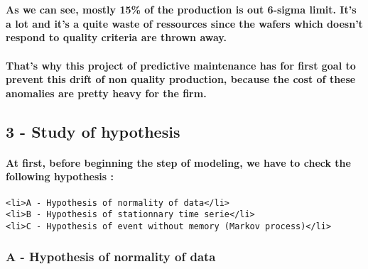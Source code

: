 \documentclass[11pt]{article}
\begin{document}
    \begin{center}
    \end{center}
    { \hspace*{\fill} \\}
    
    \paragraph{As we can see, mostly 15\% of the production is out 6-sigma
limit. It's a lot and it's a quite waste of ressources since the wafers
which doesn't respond to quality criteria are thrown
away.}\label{as-we-can-see-mostly-15-of-the-production-is-out-6-sigma-limit.-its-a-lot-and-its-a-quite-waste-of-ressources-since-the-wafers-which-doesnt-respond-to-quality-criteria-are-thrown-away.}

\paragraph{That's why this project of predictive maintenance has for
first goal to prevent this drift of non quality production, because the
cost of these anomalies are pretty heavy for the
firm.}\label{thats-why-this-project-of-predictive-maintenance-has-for-first-goal-to-prevent-this-drift-of-non-quality-production-because-the-cost-of-these-anomalies-are-pretty-heavy-for-the-firm.}

    \subsection{3 - Study of hypothesis}\label{study-of-hypothesis}

    \paragraph{At first, before beginning the step of modeling, we have to
check the following hypothesis
:}\label{at-first-before-beginning-the-step-of-modeling-we-have-to-check-the-following-hypothesis}

\begin{verbatim}
<li>A - Hypothesis of normality of data</li>
<li>B - Hypothesis of stationnary time serie</li>
<li>C - Hypothesis of event without memory (Markov process)</li>
\end{verbatim}

    \subsubsection{A - Hypothesis of normality of
data}\label{a---hypothesis-of-normality-of-data}
\end{document}
